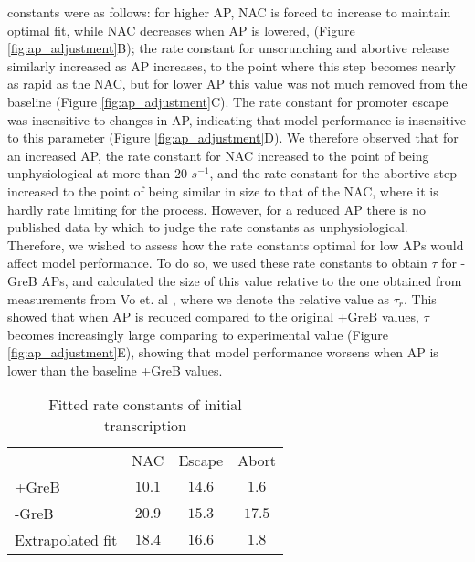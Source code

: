 constants were as follows: for higher AP, NAC is forced to increase to
maintain optimal fit, while NAC decreases when AP is lowered, (Figure
\ref{fig:ap_adjustment}B); the rate constant for unscrunching
and abortive release similarly increased as AP increases, to the point where
this step becomes nearly as rapid as the NAC, but for lower AP this value was
not much removed from the baseline (Figure \ref{fig:ap_adjustment}C). The rate
constant for promoter escape was insensitive to changes in AP, indicating that
model performance is insensitive to this parameter (Figure
\ref{fig:ap_adjustment}D). We therefore observed that for an increased AP, the
rate constant for NAC increased to the point of being unphysiological at more
than 20 $s^{-1}$, and the rate constant for the abortive step increased to the
point of being similar in size to that of the NAC, where it is hardly rate
limiting for the process. However, for a reduced AP there is no published data
by which to judge the rate constants as unphysiological. Therefore, we wished
to assess how the rate constants optimal for low APs would affect model
performance. To do so, we used these rate constants to obtain $\tau$ for -GreB
APs, and calculated the size of this value relative to the one obtained from
measurements from Vo et. al \cite{vo_vitro_2003-1}, where we denote the
relative value as $\tau_r$. This showed that when AP is reduced compared to the
original +GreB values, $\tau$ becomes increasingly large comparing to 
experimental value (Figure \ref{fig:ap_adjustment}E), showing that model
performance worsens when AP is lower than the baseline +GreB values.

\begin{table}
  \label{tab:param_fit_revyakin}
  \caption{Fitted rate constants of initial transcription}
  \begin{center}
    \begin{tabular}{lccc}
       \toprule
       & NAC & Escape & Abort \\
       +GreB & $10.1$ & $14.6$ & $1.6$ \\
       -GreB & $20.9$ & $15.3$ & $17.5$ \\
       Extrapolated fit & $18.4$ & $16.6$ & $1.8$ \\
    \end{tabular}
  \end{center}
\end{table}

